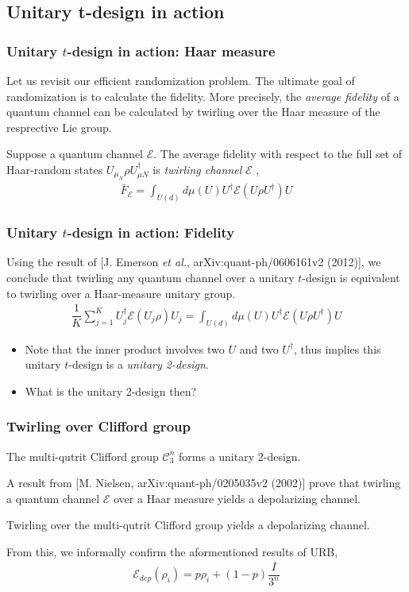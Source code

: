 \documentclass{beamer}
\begin{document}
\subsection{Unitary t-design in action}
\begin{frame}
  \frametitle{Unitary $t$-design in action: Haar measure}
  Let us revisit our efficient randomization problem. The ultimate goal of randomization is to calculate the fidelity. More precisely, the \textit{average fidelity} of a quantum channel can be calculated by twirling over the Haar measure of the resprective Lie group.
  \begin{definition}
    Suppose a quantum channel $\mathcal{E}$. The average fidelity with respect to the full set of Haar-random states $U_{\mu_N}\rho U_{\mu N}^\dagger$ is \textit{twirling channel} $\mathcal{E}$ , 
    \begin{align}
      \bar{F}_{\mathcal{E}} = \int_{U(d)} d\mu(U) U^\dagger \mathcal{E}(U\rho U^\dagger)U 
    \end{align}
  \end{definition}
\end{frame}
\begin{frame}
  \frametitle{Unitary $t$-design in action: Fidelity}
  Using the result of [J. Emerson \textit{et al.}, arXiv:quant-ph/0606161v2 (2012)], we conclude that twirling any quantum channel over a unitary $t$-design is equivalent to twirling over a Haar-measure unitary group.
  \begin{align}
    \dfrac{1}{K}\sum_{j=1}^K U_j^\dagger \mathcal{E}(U_j\rho) U_j = \int_{U(d)} d\mu(U) U^\dagger \mathcal{E}(U\rho U^\dagger)U 
  \end{align}
  \begin{itemize}
    \item Note that the inner product involves two $U$ and two $U^\dagger$, thus implies this unitary $t$-design is a \textit{unitary 2-design}.
    \item What is the unitary 2-design then?
  \end{itemize}
\end{frame}
\begin{frame}
  \frametitle{Twirling over Clifford group}
  \begin{theorem}[$\mathcal{C}^n_3$]
    The multi-qutrit Clifford group $\mathcal{C}^n_3$ forms a unitary 2-design.
  \end{theorem}
  A result from [M. Nielsen, arXiv:quant-ph/0205035v2 (2002)] prove that twirling a quantum channel $\mathcal{E}$ over a Haar measure yields a depolarizing channel.
  \begin{corollary}
    Twirling over the multi-qutrit Clifford group yields a depolarizing channel.
  \end{corollary}
  From this, we informally confirm the aformentioned results of URB,
  \begin{align} 
    \mathcal{E}_{dep}(\rho_i) = p\rho_i + (1-p)\dfrac{I}{3^n}
  \end{align}
\end{frame}
\end{document}
